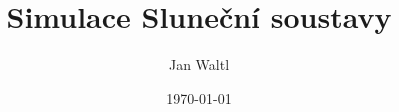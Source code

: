 \documentclass[a4paper,hidelinks]{report}
\title{Simulace Sluneční soustavy}
\date{\today}
\author{Jan Waltl}
\begin{document}
	
	\newpage
	\tableofcontents
	\lstlistoflistings
	\newpage
	
	
	
	
	
	
	
	
	
	

	
\end{document}
